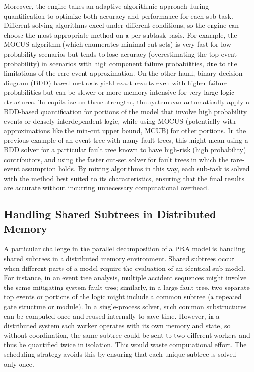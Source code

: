 {Moreover, the engine takes an adaptive algorithmic approach during quantification to optimize both accuracy and performance for each sub-task. Different solving algorithms excel under different conditions, so the engine can choose the most appropriate method on a per-subtask basis. For example, the MOCUS algorithm (which enumerates minimal cut sets) is very fast for low-probability scenarios but tends to lose accuracy (overestimating the top event probability) in scenarios with high component failure probabilities, due to the limitations of the rare-event approximation. On the other hand, binary decision diagram (BDD) based methods yield exact results even with higher failure probabilities but can be slower or more memory-intensive for very large logic structures. To capitalize on these strengths, the system can automatically apply a BDD-based quantification for portions of the model that involve high probability events or densely interdependent logic, while using MOCUS (potentially with approximations like the min-cut upper bound, MCUB) for other portions. In the previous example of an event tree with many fault trees, this might mean using a BDD solver for a particular fault tree known to have high-risk (high probability) contributors, and using the faster cut-set solver for fault trees in which the rare-event assumption holds. By mixing algorithms in this way, each sub-task is solved with the method best suited to its characteristics, ensuring that the final results are accurate without incurring unnecessary computational overhead.

\subsection{Handling Shared Subtrees in Distributed Memory} A particular challenge in the parallel decomposition of a PRA model is handling shared subtrees in a distributed memory environment. Shared subtrees occur when different parts of a model require the evaluation of an identical sub-model. For instance, in an event tree analysis, multiple accident sequences might involve the same mitigating system fault tree; similarly, in a large fault tree, two separate top events or portions of the logic might include a common subtree (a repeated gate structure or module). In a single-process solver, such common substructures can be computed once and reused internally to save time. However, in a distributed system each worker operates with its own memory and state, so without coordination, the same subtree could be sent to two different workers and thus be quantified twice in isolation. This would waste computational effort. The scheduling strategy avoids this by ensuring that each unique subtree is solved only once.

}
